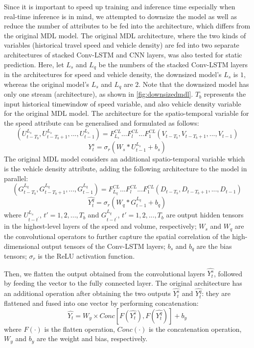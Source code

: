 \documentclass[11pt]{uonthesis}
\begin{document}
Since it is important to speed up training and inference time especially when real-time inference is in mind, we attempted to downsize the model as well as reduce the number of attributes to be fed into the architecture, which differs from the original MDL model. The original MDL architecture, where the two kinds of variables (historical travel speed and vehicle density) are fed into two separate architectures of stacked Conv-LSTM and CNN layers, was also tested for static prediction. Here, let $L_s$ and $L_q$ be the numbers of the stacked Conv-LSTM layers in the architectures for speed and vehicle density, the downsized model's $L_s$ is $1$, whereas the original model's $L_s$ and $L_q$ are $2$. Note that the downsized model has only one stream (architecture), as shown in \ref{fig:downsizedmdl}. $T_b$ represents the input historical timewindow of speed variable, and also vehicle density variable for the original MDL model. The architecture for the spatio-temporal variable for the speed attribute can be generalised and formulated as follows:
\[ (U^{L_s}_{t-T_b}, U^{L_s}_{t-T_b+1},..., U^{L_s}_{t-1}) = F^{CL}_{L_s}...F^{CL}_{l}...F^{CL}_{1} (V_{t-T_b}, V_{t-T_b+1},..., V_{t-1}) \]
\[ \hat{Y^s_{t}} = {\sigma}_r (W_s\ast{U^{L_s}_{t-1}} + b_s) \]
The original MDL model considers an additional spatio-temporal variable which is the vehicle density attribute, adding the following architecture to the model in parallel:
\[ (G^{L_q}_{t-T_b}, G^{L_q}_{t-T_b+1},...,G^{L_q}_{t-1}) = F^{CL}_{L_q}...F^{CL}_{l}...F^{CL}_{1} (D_{t-T_b}, D_{t-T_b+1},..., D_{t-1}) \]
\[ \hat{Y^q_{t}} = {\sigma}_r (W_q\ast{G^{L_q}_{t-1}} + b_q) \]
where $U^{L_s}_{t-t^{\prime}}$, $t\prime = 1, 2,..., T_b$ and $G^{L_q}_{t-t^{\prime}}$, $t\prime = 1, 2,..., T_b$ are output hidden tensors in the highest-level layers of the speed and volume, respectively; $W_s$ and $W_q$ are the convolutional operators to further capture the spatial correlation of the high-dimensional output tensors of the Conv-LSTM layers; $b_s$ and $b_q$ are the bias tensors; $\sigma_r$ is the ReLU activation function.

Then, we flatten the output obtained from the convolutional layers $\hat{Y^{s}_t}$, followed by feeding the vector to the fully connected layer. The original architecture has an additional operation after obtaining the two outputs $\hat{Y^{s}_t}$ and $\hat{Y^q_t}$: they are flattened and fused into one vector by performing concatenation:
\[ \hat{Y_t} = W_y \times Conc[F(\hat{Y^s_t}), F(\hat{Y^q_t})] + b_y\]
where $F(\cdot)$ is the flatten operation, $Conc(\cdot)$ is the concatenation operation, $W_y$ and $b_y$ are the weight and bias, respectively. %
\end{document}

